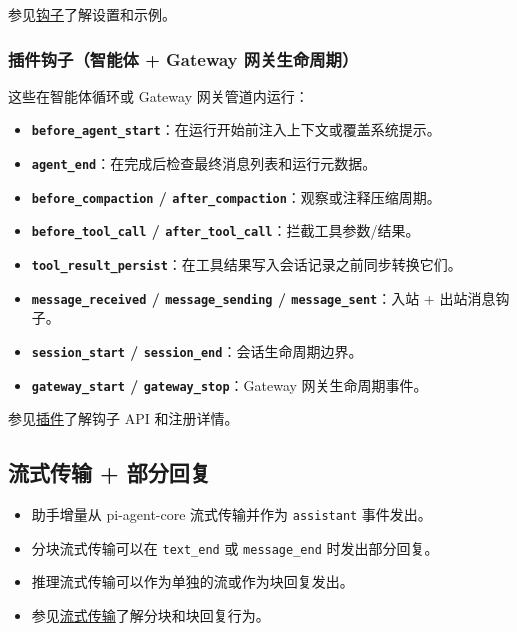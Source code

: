 参见\href{/automation/hooks}{钩子}了解设置和示例。

\subsubsection{插件钩子（智能体 + Gateway 网关生命周期）}


这些在智能体循环或 Gateway 网关管道内运行：

\begin{itemize}
  \item \textbf{\texttt{before\_agent\_start}}：在运行开始前注入上下文或覆盖系统提示。
  \item \textbf{\texttt{agent\_end}}：在完成后检查最终消息列表和运行元数据。
  \item \textbf{\texttt{before\_compaction} / \texttt{after\_compaction}}：观察或注释压缩周期。
  \item \textbf{\texttt{before\_tool\_call} / \texttt{after\_tool\_call}}：拦截工具参数/结果。
  \item \textbf{\texttt{tool\_result\_persist}}：在工具结果写入会话记录之前同步转换它们。
  \item \textbf{\texttt{message\_received} / \texttt{message\_sending} / \texttt{message\_sent}}：入站 + 出站消息钩子。
  \item \textbf{\texttt{session\_start} / \texttt{session\_end}}：会话生命周期边界。
  \item \textbf{\texttt{gateway\_start} / \texttt{gateway\_stop}}：Gateway 网关生命周期事件。
\end{itemize}


参见\href{/tools/plugin\#plugin-hooks}{插件}了解钩子 API 和注册详情。

\subsection{流式传输 + 部分回复}


\begin{itemize}
  \item 助手增量从 pi-agent-core 流式传输并作为 \texttt{assistant} 事件发出。
  \item 分块流式传输可以在 \texttt{text\_end} 或 \texttt{message\_end} 时发出部分回复。
  \item 推理流式传输可以作为单独的流或作为块回复发出。
  \item 参见\href{/concepts/streaming}{流式传输}了解分块和块回复行为。
\end{itemize}


